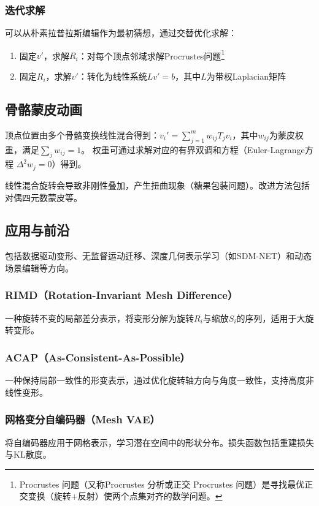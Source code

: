 \documentclass[12pt]{article}
\begin{document}
\subsubsection{迭代求解}
可以从朴素拉普拉斯编辑作为最初猜想，通过交替优化求解：
\begin{enumerate}
    \item 固定$v'$，求解$R_i$：对每个顶点邻域求解Procrustes问题\footnote{Procrustes 问题（又称Procrustes 分析或正交 Procrustes 问题）是寻找最优正交变换（旋转+反射）使两个点集对齐的数学问题。}
    \item 固定$R_i$，求解$v'$：转化为线性系统$L v' = b$，其中$L$为带权Laplacian矩阵
\end{enumerate}

\subsection{骨骼蒙皮动画}

顶点位置由多个骨骼变换线性混合得到：$v_i' = \sum_{j=1}^m w_{ij} T_j v_i$，其中$w_{ij}$为蒙皮权重，满足$\sum_j w_{ij} = 1$。
权重可通过求解对应的有界双调和方程（Euler-Lagrange方程 $\Delta^2 w_j = 0$）得到。

线性混合旋转会导致非刚性叠加，产生扭曲现象（糖果包装问题）。改进方法包括对偶四元数蒙皮等。

\subsection{应用与前沿}

包括数据驱动变形、无监督运动迁移、深度几何表示学习（如SDM-NET）和动态场景编辑等方向。

\subsubsection*{RIMD（Rotation-Invariant Mesh Difference）}
一种旋转不变的局部差分表示，将变形分解为旋转$R_i$与缩放$S_i$的序列，适用于大旋转变形。

\subsubsection*{ACAP（As-Consistent-As-Possible）}
一种保持局部一致性的形变表示，通过优化旋转轴方向与角度一致性，支持高度非线性变形。

\subsubsection*{网格变分自编码器（Mesh VAE）}
将自编码器应用于网格表示，学习潜在空间中的形状分布。损失函数包括重建损失与KL散度。
\end{document}
